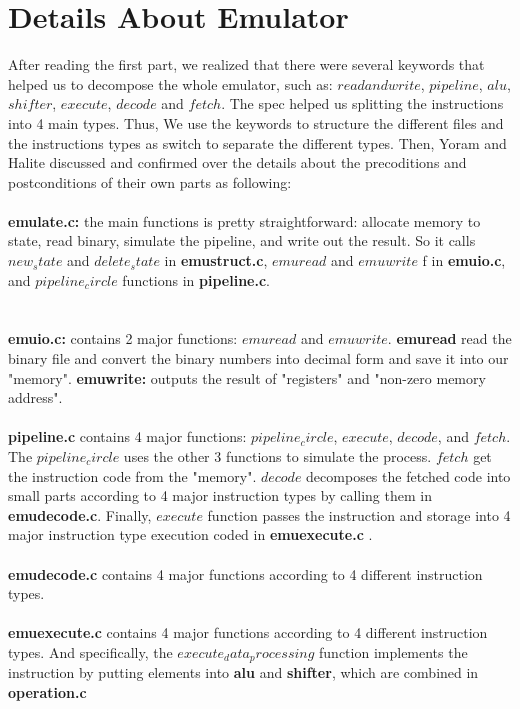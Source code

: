 \documentclass[a4paper]{article}
\begin{document}
\section{Details About Emulator}
After reading the first part, we realized that there were several keywords that helped us to decompose the whole emulator, such as: $read and write$, $pipeline$, $alu$, $shifter$, $execute$, $decode$ and $fetch$. The spec helped us splitting the instructions into 4 main types. Thus, We use the keywords to structure the different files and the instructions types as switch to separate the different types. Then, Yoram and Halite discussed and confirmed over the details about the precoditions and postconditions of their own parts as following:
\\\\
\textbf{emulate.c:} the main functions is pretty straightforward: allocate memory to state, read binary, simulate the pipeline, and write out the result. So it calls $new_state$ and $delete_state$ in \textbf{emustruct.c}, $emuread$ and $emuwrite$ f in \textbf{emuio.c}, and $pipeline_circle$ functions in \textbf{pipeline.c}.\\
\\\\
\textbf{emuio.c:} contains 2 major functions: $emuread$ and $emuwrite$. \textbf{emuread} read the binary file and convert the binary numbers into decimal form and save it into our "memory".
\textbf{emuwrite:} outputs the result of "registers" and "non-zero memory address".
\\\\
\textbf{pipeline.c} contains 4 major functions: $pipeline_circle$, $execute$, $decode$, and $fetch$. The $pipeline_circle$ uses the other 3 functions to simulate the process. $fetch$ get the instruction code from the "memory". $decode$ decomposes the fetched code into small parts according to 4 major instruction types by calling them in \textbf{emudecode.c}. Finally, $execute$ function passes the instruction and storage into 4 major instruction type execution coded in \textbf{emuexecute.c} .
\\\\
\textbf{emudecode.c} contains 4 major functions according to 4 different instruction types.
\\\\
\textbf{emuexecute.c} contains 4 major functions according to 4 different instruction types. And specifically, the $execute_data_processing$ function implements the instruction by putting elements into \textbf{alu} and \textbf{shifter}, which are combined in \textbf{operation.c}\\
\end{document}
